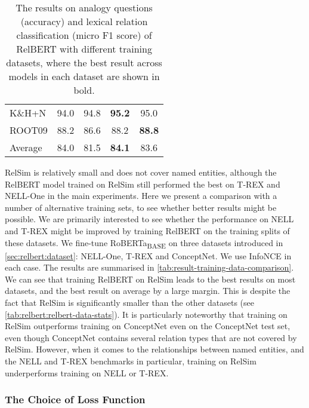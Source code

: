 \documentclass[3p]{elsarticle}
\begin{document}
{\begin{table}[!t]
\begin{tabular}{lcccc}
K\&H+N                     & 94.0           & 94.8          & \textbf{95.2}  & 95.0        \\
ROOT09                    & 88.2            & 86.6          & 88.2  & \textbf{88.8}        \\\midrule
Average                   & 84.0   & 81.5          & \textbf{84.1}  & 83.6       \\
\bottomrule
\end{tabular}
\caption{The results on analogy questions (accuracy) and lexical relation classification (micro F1 score) of RelBERT with different training datasets, where the best result across models in each dataset are shown in bold. }
\label{tab:result-training-data-comparison}
\end{table}

RelSim is relatively small and does not cover named entities, although the RelBERT model trained on RelSim still performed the best on T-REX and NELL-One in the main experiments. Here we present a comparison with a number of alternative training sets, to see whether better results might be possible. We are primarily interested to see whether the performance on NELL and T-REX might be improved by training RelBERT on the training splits of these datasets. We fine-tune RoBERTa\textsubscript{BASE} on three datasets introduced in \autoref{sec:relbert:dataset}:  NELL-One, T-REX and ConceptNet. We use InfoNCE in each case. The results are summarised in \autoref{tab:result-training-data-comparison}. We can see that training RelBERT on RelSim leads to the best results on most datasets, and the best result on average by a large margin. This is despite the fact that RelSim is significantly smaller than the other datasets (see \autoref{tab:relbert:relbert-data-stats}). It is particularly noteworthy that training on RelSim outperforms training on ConceptNet even on the ConceptNet test set, even though ConceptNet contains several relation types that are not covered by RelSim. However, when it comes to the relationships between named entities, and the NELL and T-REX benchmarks in particular, training on RelSim underperforms training on NELL or T-REX. 

\subsubsection{The Choice of Loss Function}\label{sec:relbert:the-choice-of-loss-function}

}
\end{document}
